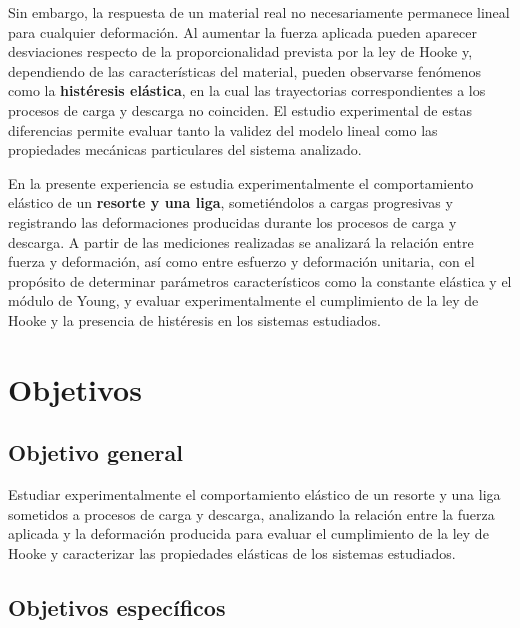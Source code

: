 \documentclass[11pt,a4paper]{article}
\begin{document}
Sin embargo, la respuesta de un material real no necesariamente permanece lineal para cualquier deformación. Al aumentar la fuerza aplicada pueden aparecer desviaciones respecto de la proporcionalidad prevista por la ley de Hooke y, dependiendo de las características del material, pueden observarse fenómenos como la \textbf{histéresis elástica}, en la cual las trayectorias correspondientes a los procesos de carga y descarga no coinciden. El estudio experimental de estas diferencias permite evaluar tanto la validez del modelo lineal como las propiedades mecánicas particulares del sistema analizado.

En la presente experiencia se estudia experimentalmente el comportamiento elástico de un \textbf{resorte y una liga}, sometiéndolos a cargas progresivas y registrando las deformaciones producidas durante los procesos de carga y descarga. A partir de las mediciones realizadas se analizará la relación entre fuerza y deformación, así como entre esfuerzo y deformación unitaria, con el propósito de determinar parámetros característicos como la constante elástica y el módulo de Young, y evaluar experimentalmente el cumplimiento de la ley de Hooke y la presencia de histéresis en los sistemas estudiados.

\newpage

\section{Objetivos}

\subsection{Objetivo general}

\begingroup
\setlength{\leftskip}{1.5em}
\noindent
Estudiar experimentalmente el comportamiento elástico de un resorte y una liga sometidos a procesos de carga y descarga, analizando la relación entre la fuerza aplicada y la deformación producida para evaluar el cumplimiento de la ley de Hooke y caracterizar las propiedades elásticas de los sistemas estudiados.
\par
\endgroup

\subsection{Objetivos específicos}
\end{document}

